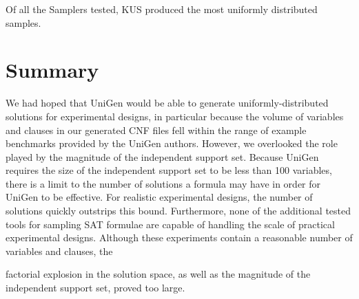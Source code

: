 Of all the Samplers tested, KUS produced the most uniformly distributed samples.

\bigbreak
\bigbreak

\section{Summary}

We had hoped that UniGen would be able to generate uniformly-distributed solutions for experimental designs, in particular because the volume of variables and clauses in our generated CNF files fell within the range of example benchmarks provided by the UniGen authors. However, we overlooked the role played by the magnitude of the independent support set. Because UniGen requires the size of the independent support set to be less than 100 variables, there is a limit to the number of solutions a formula may have in order for UniGen to be effective. For realistic experimental designs, the number of solutions quickly outstrips this bound. Furthermore, none of the additional tested tools for sampling SAT formulae are capable of handling the scale of practical experimental designs. Although these experiments contain a reasonable number of variables and clauses, the

\newpage

\noindent factorial explosion in the solution space, as well as the magnitude of the independent support set, proved too large.
